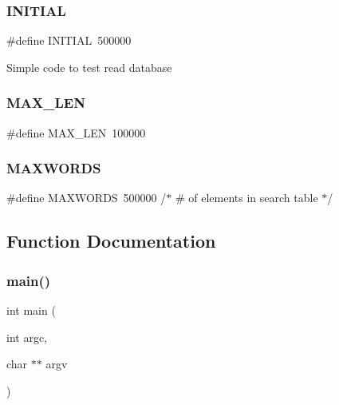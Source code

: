 \subsubsection{\texorpdfstring{INITIAL}{INITIAL}}
{\footnotesize\ttfamily \#define I\+N\+I\+T\+I\+AL~500000}

Simple code to test read database \mbox{\label{adat-devel_2other__libs_2filedb_2filehash_2tread_8c_aabf4f709c8199e41cf279c77112345fe}} 
\subsubsection{\texorpdfstring{MAX\_LEN}{MAX\_LEN}}
{\footnotesize\ttfamily \#define M\+A\+X\+\_\+\+L\+EN~100000}

\mbox{\label{adat-devel_2other__libs_2filedb_2filehash_2tread_8c_aa6b319146daf33409da1bbe4194553dc}} 
\subsubsection{\texorpdfstring{MAXWORDS}{MAXWORDS}}
{\footnotesize\ttfamily \#define M\+A\+X\+W\+O\+R\+DS~500000	       /$\ast$ \# of elements in search table $\ast$/}



\subsection{Function Documentation}
\mbox{\label{adat-devel_2other__libs_2filedb_2filehash_2tread_8c_a3c04138a5bfe5d72780bb7e82a18e627}} 
\subsubsection{\texorpdfstring{main()}{main()}}
{\footnotesize\ttfamily int main (\begin{DoxyParamCaption}\item[{int}]{argc,  }\item[{char $\ast$$\ast$}]{argv }\end{DoxyParamCaption})}

